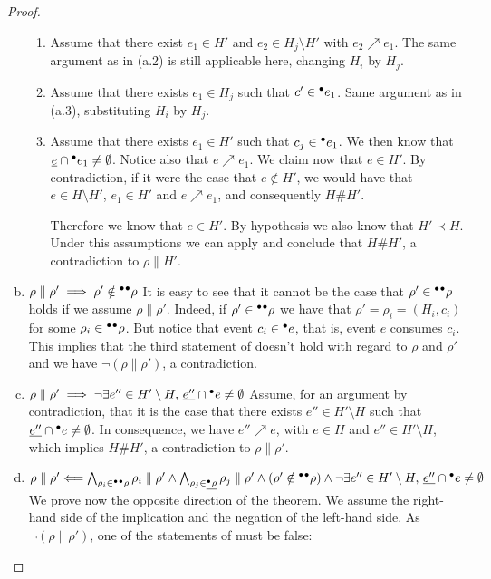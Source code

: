 \documentclass{article}
\newcommand{\confl}{\ensuremath{\mathord{\#}}}
\begin{document}
\begin{proof}
\begin{enumerate}[(a)]
\begin{enumerate}[1.]
\item Assume that there exist $e_1 \in H'$ and $e_2 \in H_j \setminus H'$ with
$e_2 \nearrow e_1$.  The same argument as in (a.2) is still applicable here,
changing $H_i$ by $H_j$.

\item Assume that there exists $e_1 \in H_j$ such that $c' \in {}^\bullet e_1$.
Same argument as in (a.3), substituting $H_i$ by $H_j$.

\item Assume that there exists $e_1 \in H'$ such that $c_j \in {}^\bullet e_1$.  We
then know that $\underline{e} \cap {}^\bullet e_1 \not= \emptyset$.   Notice also
that $e \nearrow e_1$.  We claim now that $e \in H'$.  By contradiction, if it
were the case that $e \notin H'$, we would have that $e \in H \setminus H'$,
$e_1 \in H'$ and $e \nearrow e_1$, and consequently $H \confl H'$.

Therefore we know that $e \in H'$.  By hypothesis we also know that $H' \prec
H$.  Under this assumptions we can apply  and conclude that
$H \confl H'$, a contradiction to $\rho \parallel H'$.
\end{enumerate}

\item $\rho \parallel \rho' \implies \rho' \notin {}^\bullet{}^\bullet\rho$  It is easy
to see that it cannot be the case that $\rho' \in {}^\bullet{}^\bullet\rho$ holds if we
assume $\rho \parallel \rho'$.  Indeed, if $\rho' \in {}^\bullet{}^\bullet\rho$ we have
that $\rho' = \rho_i = (H_i, c_i)$ for some $\rho_i \in {}^\bullet{}^\bullet\rho$.  But
notice that event $c_i \in {}^\bullet e$, that is, event $e$ consumes $c_i$.  This
implies that the third statement of  doesn't hold with
regard to $\rho$ and $\rho'$ and we have $\lnot (\rho \parallel \rho')$, a
contradiction.

\item $\rho \parallel \rho' \implies \lnot \exists e'' \in H' \setminus
H,\, \underline{e''} \cap {}^\bullet e \not= \emptyset$  Assume, for an argument by
contradiction, that it is the case that there exists $e'' \in H' \setminus H$
such that $\underline{e''} \cap {}^\bullet e \not= \emptyset$.  In consequence, we have
$e'' \nearrow e$, with $e \in H$ and $e'' \in H' \setminus H$, which implies $H
\confl H'$, a contradiction to $\rho \parallel \rho'$.

\item $\rho \parallel \rho' \Longleftarrow \bigwedge_{\rho_i \in {}^\bullet{}^\bullet\rho} \rho_i \parallel \rho' \land \bigwedge_{\rho_j \in \underline{{}^\bullet\rho}}
\rho_j \parallel \rho' \land (\rho' \notin {}^\bullet{}^\bullet\rho) \land \lnot \exists
e'' \in H' \setminus H,\, \underline{e''} \cap {}^\bullet e \not= \emptyset$  We prove now
the opposite direction of the theorem.  We assume the right-hand side of the
implication and the negation of the left-hand side.  As $\lnot (\rho \parallel
\rho')$, one of the statements of  must be false:


\end{enumerate}
\end{proof}
\end{document}
